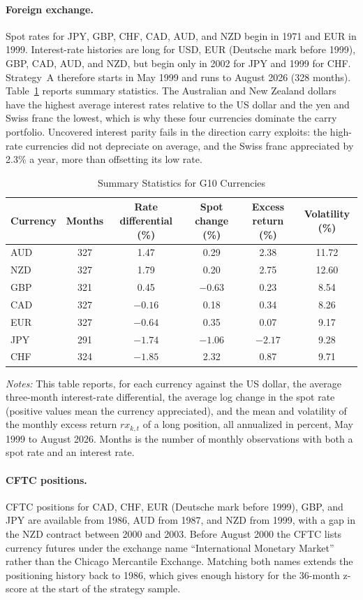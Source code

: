 \documentclass[11pt]{article}
\newcommand{\tabnote}[1]{\par\vspace{0.3em}\begin{minipage}{\linewidth}\footnotesize\setstretch{1.0}\textit{Notes:} #1\end{minipage}}
\begin{document}
\paragraph{Foreign exchange.}
Spot rates for JPY, GBP, CHF, CAD, AUD, and NZD begin in 1971 and EUR in 1999. Interest-rate histories are long for USD, EUR (Deutsche mark before 1999), GBP, CAD, AUD, and NZD, but begin only in 2002 for JPY and 1999 for CHF. Strategy~A therefore starts in May 1999 and runs to August 2026 (328 months). Table~\ref{tab:sum} reports summary statistics. The Australian and New Zealand dollars have the highest average interest rates relative to the US dollar and the yen and Swiss franc the lowest, which is why these four currencies dominate the carry portfolio. Uncovered interest parity fails in the direction carry exploits: the high-rate currencies did not depreciate on average, and the Swiss franc appreciated by 2.3\% a year, more than offsetting its low rate.

\begin{table}[!htbp]
\centering
\caption{Summary Statistics for G10 Currencies}\label{tab:sum}
\small
\begin{tabular}{lccccc}
\toprule
Currency & Months & Rate differential (\%) & Spot change (\%) & Excess return (\%) & Volatility (\%) \\
\midrule
AUD & 327 & 1.47 & 0.29 & 2.38 & 11.72 \\
NZD & 327 & 1.79 & 0.20 & 2.75 & 12.60 \\
GBP & 321 & 0.45 & $-0.63$ & 0.23 & 8.54 \\
CAD & 327 & $-0.16$ & 0.18 & 0.34 & 8.26 \\
EUR & 327 & $-0.64$ & 0.35 & 0.07 & 9.17 \\
JPY & 291 & $-1.74$ & $-1.06$ & $-2.17$ & 9.28 \\
CHF & 324 & $-1.85$ & 2.32 & 0.87 & 9.71 \\
\bottomrule
\end{tabular}
\tabnote{This table reports, for each currency against the US dollar, the average three-month interest-rate differential, the average log change in the spot rate (positive values mean the currency appreciated), and the mean and volatility of the monthly excess return $rx_{k,t}$ of a long position, all annualized in percent, May 1999 to August 2026. Months is the number of monthly observations with both a spot rate and an interest rate.}
\end{table}

\paragraph{CFTC positions.}
CFTC positions for CAD, CHF, EUR (Deutsche mark before 1999), GBP, and JPY are available from 1986, AUD from 1987, and NZD from 1999, with a gap in the NZD contract between 2000 and 2003. Before August 2000 the CFTC lists currency futures under the exchange name ``International Monetary Market'' rather than the Chicago Mercantile Exchange. Matching both names extends the positioning history back to 1986, which gives enough history for the 36-month z-score at the start of the strategy sample.
\end{document}
